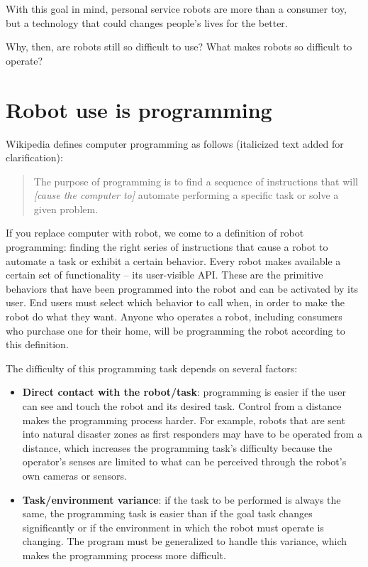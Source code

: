 \documentclass[10pt,twocolumn]{article}
\begin{document}
With this goal in mind, personal service robots are more than a consumer toy, but a technology that could changes people's lives for the better.
\begin{changebar}
Why, then, are robots still so difficult to use? What makes robots so difficult to operate?

\section{Robot use is programming}

Wikipedia defines computer programming as follows (italicized text added for clarification):

\begin{quote}
The purpose of programming is to find a sequence of instructions that will {\it [cause the computer to]} automate performing a specific task or solve a given problem.
\end{quote}

If you replace computer with robot, we come to a definition of robot programming: finding the right series of instructions that cause a robot to automate a task or exhibit a certain behavior. Every robot makes available a certain set of functionality -- its user-visible API. These are the primitive behaviors that have been programmed into the robot and can be activated by its user. End users must select which behavior to call when, in order to make the robot do what they want. Anyone who operates a robot, including consumers who purchase one for their home, will be programming the robot according to this definition.

The difficulty of this programming task depends on several factors:

\begin{itemize}
\item {\bf Direct contact with the robot/task}: programming is easier if the user can see and touch the robot and its desired task. Control from a distance makes the programming process harder. For example, robots that are sent into natural disaster zones as first responders may have to be operated from a distance, which increases the programming task's difficulty because the operator's senses are limited to what can be perceived through the robot's own cameras or sensors.

\item {\bf Task/environment variance}: if the task to be performed is always the same, the programming task is easier than if the goal task changes significantly or if the environment in which the robot must operate is changing. The program must be generalized to handle this variance, which makes the programming process more difficult.


\end{itemize}
\end{changebar}
\end{document}
